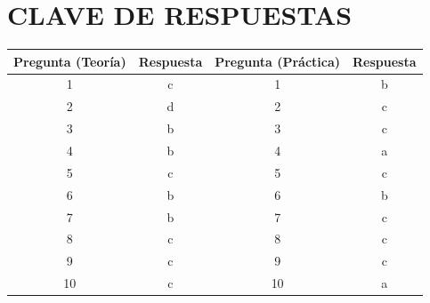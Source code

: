 \documentclass[12pt]{article}
\begin{document}
\newpage
\section*{CLAVE DE RESPUESTAS}

\begin{table}[h]
\centering
\begin{tabular}{|c|c|c|c|}
\hline
\textbf{Pregunta (Teoría)} & \textbf{Respuesta} & \textbf{Pregunta (Práctica)} & \textbf{Respuesta} \\ \hline
1 & c & 1 & b \\ \hline
2 & d & 2 & c \\ \hline
3 & b & 3 & c \\ \hline
4 & b & 4 & a \\ \hline
5 & c & 5 & c \\ \hline
6 & b & 6 & b \\ \hline
7 & b & 7 & c \\ \hline
8 & c & 8 & c \\ \hline
9 & c & 9 & c \\ \hline
10 & c & 10 & a \\ \hline
\end{tabular}
\end{table}
\end{document}
